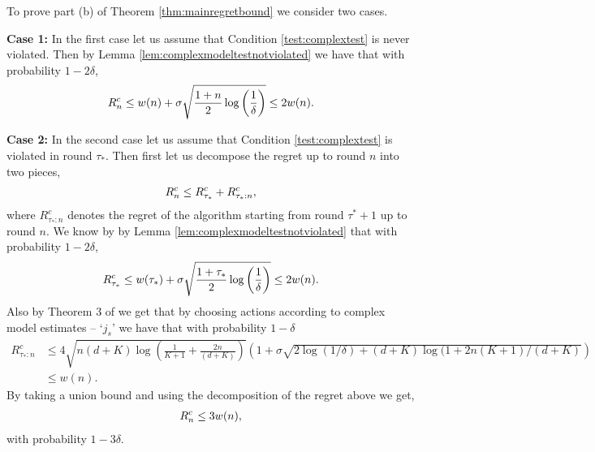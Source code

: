\begin{Proof}
To prove part (b) of Theorem \ref{thm:mainregretbound} we consider two cases. 

\textbf{Case 1:} In the first case let us assume that Condition \eqref{test:complextest} is never violated. Then by Lemma \ref{lem:complexmodeltestnotviolated} we have that with probability $1-2\delta$,
\begin{align*}
    R^c_{n} \le w(n) + \sigma \sqrt{\frac{1+n}{2}\log \left(\frac{1}{\delta}\right)}\le 2w(n).
\end{align*}

\textbf{Case 2:} In the second case let us assume that Condition \eqref{test:complextest} is violated in round $\tau_{*}$. Then first let us decompose the regret up to round $n$ into two pieces,
\begin{align*}
    R^c_{n} \le R^c_{\tau_{*}} + R^c_{\tau_{*}:n},
\end{align*}
where $R^c_{\tau_{*}:n}$ denotes the regret of the algorithm starting from round $\tau^* +1$ up to round $n$. We know by by Lemma \ref{lem:complexmodeltestnotviolated} that with probability $1-2\delta$, $$R^c_{\tau_*} \le w(\tau_*) + \sigma \sqrt{\frac{1+\tau_*}{2}\log \left(\frac{1}{\delta}\right)} \le 2w(n).$$ Also by Theorem 3 of \citep{abbasi2011improved} we get that by choosing actions according to complex model estimates -- `$j_s$' we have that with probability $1-\delta$
\small
\begin{align*}
R^c_{\tau_{*}:n} &\le 4\sqrt{n(d+K)\log\left(\frac{1}{K+1} + \frac{2n}{(d+K)}\right)}\left(1 + \sigma\sqrt{2\log(1/\delta)+ (d+K)\log(1+ 2n(K+1)/(d+K)} \right) \\
& \le w(n).
\end{align*}\normalsize
By taking a union bound and using the decomposition of the regret above we get,
\begin{align*}
    R^c_{n}\le 3w(n), 
\end{align*}
with probability $1-3\delta$.
\end{Proof}
